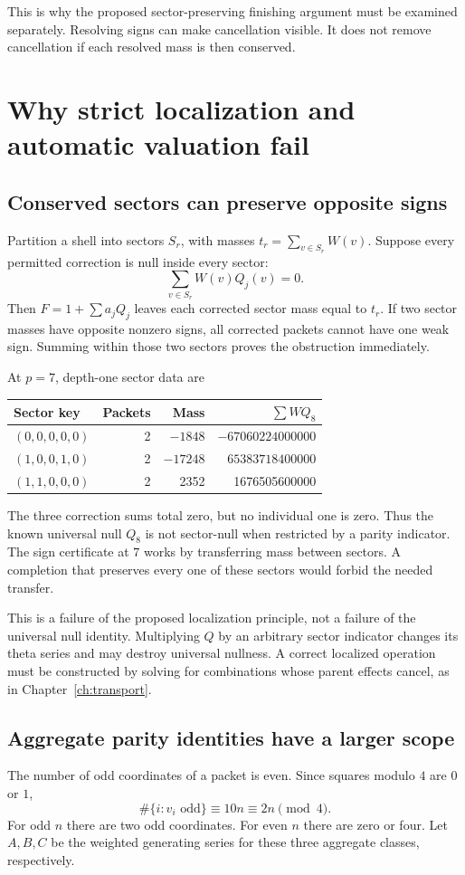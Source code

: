This is why the proposed sector-preserving finishing argument must be examined separately. Resolving signs can make cancellation visible. It does not remove cancellation if each resolved mass is then conserved.

\chapter{Why strict localization and automatic valuation fail}\label{ch:failures}
\section{Conserved sectors can preserve opposite signs}
Partition a shell into sectors $S_r$, with masses $t_r=\sum_{v\in S_r}W(v)$. Suppose every permitted correction is null inside every sector:
\[
\sum_{v\in S_r}W(v)Q_j(v)=0.
\]
Then $F=1+\sum a_jQ_j$ leaves each corrected sector mass equal to $t_r$. If two sector masses have opposite nonzero signs, all corrected packets cannot have one weak sign. Summing within those two sectors proves the obstruction immediately.

At $p=7$, depth-one sector data are
\begin{center}\small
\begin{tabular}{lrrr}
\toprule
Sector key&Packets&Mass&$\sum WQ_8$\\
\midrule
$(0,0,0,0,0)$&2&$-1848$&$-67060224000000$\\
$(1,0,0,1,0)$&2&$-17248$&$65383718400000$\\
$(1,1,0,0,0)$&2&2352&1676505600000\\
\bottomrule
\end{tabular}\end{center}
The three correction sums total zero, but no individual one is zero. Thus the known universal null $Q_8$ is not sector-null when restricted by a parity indicator. The sign certificate at $7$ works by transferring mass between sectors. A completion that preserves every one of these sectors would forbid the needed transfer.

This is a failure of the proposed localization principle, not a failure of the universal null identity. Multiplying $Q$ by an arbitrary sector indicator changes its theta series and may destroy universal nullness. A correct localized operation must be constructed by solving for combinations whose parent effects cancel, as in Chapter~\ref{ch:transport}.

\section{Aggregate parity identities have a larger scope}
The number of odd coordinates of a packet is even. Since squares modulo $4$ are $0$ or $1$,
\[
\#\{i:v_i\text{ odd}\}\equiv10n\equiv2n\pmod4.
\]
For odd $n$ there are two odd coordinates. For even $n$ there are zero or four. Let $A,B,C$ be the weighted generating series for these three aggregate classes, respectively.

